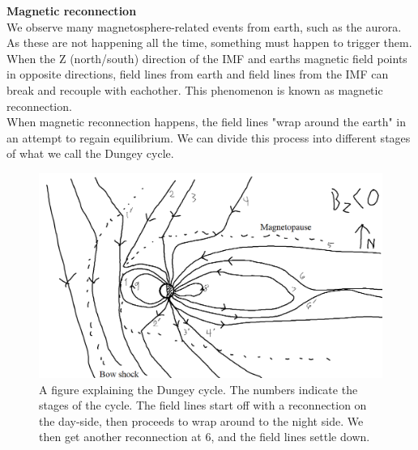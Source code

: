 \documentclass[norsk,a4paper,11pt]{article}
\begin{document}
\begin{multicols}{2}
	\textbf{Magnetic reconnection}\\
	We observe many magnetosphere-related events from earth, such as the aurora. As these are not happening all the time, something must happen to 				trigger them.\\  
	When the Z (north/south) direction of the IMF and earths magnetic field points in opposite directions, field lines from earth and field lines from the IMF can 			break and recouple with eachother. This phenomenon is known as magnetic reconnection.\\
	When magnetic reconnection happens, the field lines "wrap around the earth" in an attempt to regain equilibrium. We can divide this process into different 			stages of what we call the Dungey cycle.
	\begin{figure}[H]
		\includegraphics[scale = 0.3]{Figures/Dungey_cycle_negative.png}
		\centering
		\caption{A figure explaining the Dungey cycle. The numbers indicate the stages of the cycle. The field lines start off with a reconnection on the day-side, then proceeds to wrap around to the night side. We then get another reconnection at 6, and the field lines settle down. }
		\label{fig:dungey_cycle}
	\end{figure}


\end{multicols}
\end{document}
